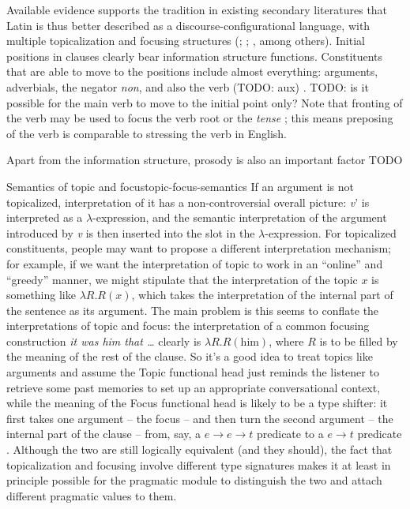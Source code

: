 \documentclass[a4paper, oneside, 12pt]{report}
\newcommand*{\citesec}[1]{\S~{#1}}
\newcommand*{\citepage}[1]{p.~{#1}}
\newcommand*{\citepages}[1]{pp.~{#1}}
\newcommand{\form}[1]{\emph{#1}}
\begin{document}
Available evidence supports the tradition in existing secondary literatures that
Latin is thus better described as a discourse-configurational language,
with multiple topicalization and focusing structures
(\citealt[\citepage{189}]{oniga2014latin}; 
\citealt[\citepage{77}]{danckaert2017development}; 
\citealt{devine2006latin}, among others).
Initial positions in clauses clearly bear information structure functions. 
Constituents that are able to move to the positions 
include almost everything: 
arguments, adverbials, the negator \form{non}, 
and also the verb (TODO: aux) 
\citep[\citesec{598}]{allen1903allen}. 
TODO: is it possible for the main verb to move to the initial point only?
Note that fronting of the verb may be used 
to focus the verb root or the \emph{tense}
\citep[\citepage{397}]{allen1903allen};
this means preposing of the verb is comparable to 
stressing the verb in English.

Apart from the information structure, 
prosody is also an important factor TODO

\begin{theorybox}{Semantics of topic and focus}{topic-focus-semantics}
    If an argument is not topicalized, 
    interpretation of it has a non-controversial overall picture: 
    \textit{v}' is interpreted as a $\lambda$-expression,
    and the semantic interpretation of the argument introduced by \textit{v}
    is then inserted into the slot in the $\lambda$-expression.
    For topicalized constituents, 
    people may want to propose a different interpretation mechanism;
    for example, if we want the interpretation of topic 
    to work in an ``online'' and ``greedy'' manner,
    we might stipulate that the interpretation of the topic $x$ 
    is something like $\lambda R . R(x)$,
    which takes the interpretation of the internal part of the sentence 
    as its argument.
    The main problem is this seems to conflate the interpretations of topic and focus:     
    the interpretation of a common focusing construction 
    \form{it was him that \dots}
    clearly is $\lambda R . R(\text{him})$, 
    where $R$ is to be filled by the meaning of the rest of the clause.
    So it's a good idea to treat topics like arguments
    and assume the Topic functional head just reminds the listener 
    to retrieve some past memories to set up an appropriate conversational context, 
    while the meaning of the Focus functional head 
    is likely to be a type shifter: 
    it first takes one argument -- the focus -- 
    and then turn the second argument -- the internal part of the clause -- 
    from, say, a $e \to e \to t$ predicate to a $e \to t$ predicate 
    \citep[\citepages{90-91}]{devine2006latin}. 
    Although the two are still logically equivalent (and they should),
    the fact that topicalization and focusing involve 
    different type signatures 
    makes it at least in principle possible 
    for the pragmatic module to 
    distinguish the two and 
    attach different pragmatic values to them.
\end{theorybox}
\end{document}
